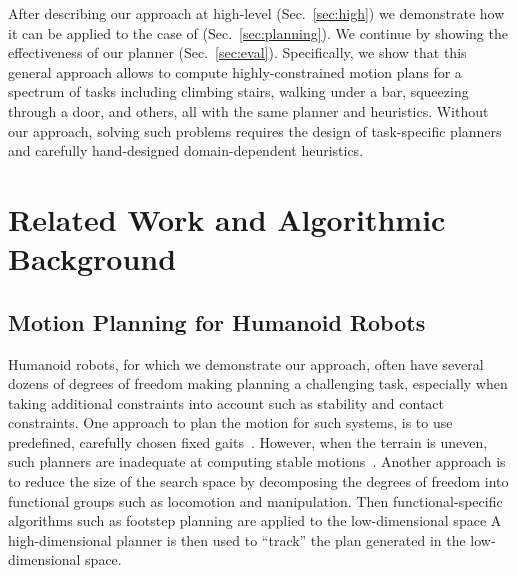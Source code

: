 \documentclass{article}
\begin{document}
%



After describing our approach at high-level (Sec.~\ref{sec:high}) we demonstrate how it can be applied to the case of \mhastar (Sec.~\ref{sec:planning}).
We continue by showing the effectiveness of our planner (Sec.~\ref{sec:eval}).
Specifically, we show that this general approach allows to compute highly-constrained motion plans for a spectrum of tasks including climbing stairs, walking under a bar, squeezing through a door, and others, all with the same planner and heuristics.  
Without our approach, solving such problems requires the design of task-specific planners~\cite{KKKHKHAI04} and carefully hand-designed domain-dependent heuristics.


\section{Related Work and Algorithmic Background}
\subsection{Motion Planning for Humanoid Robots}
\label{sec:rel}
Humanoid robots, for which we demonstrate our approach, often have several dozens of degrees of freedom making planning a challenging task, especially when taking additional constraints into account such as stability and contact constraints.
One approach to plan the motion for such systems, is to use predefined, carefully chosen fixed gaits~\cite{KKKHKHAI04}. 
However, when the terrain is uneven, such planners are inadequate at computing stable motions~\cite{HBLHW08}.
Another approach is to reduce the size of the search space by decomposing the degrees of freedom into functional groups such as locomotion and manipulation.
Then functional-specific algorithms such as footstep planning are applied to the low-dimensional space 
A high-dimensional planner is then used to ``track'' the plan generated in the low-dimensional space.
\end{document}
